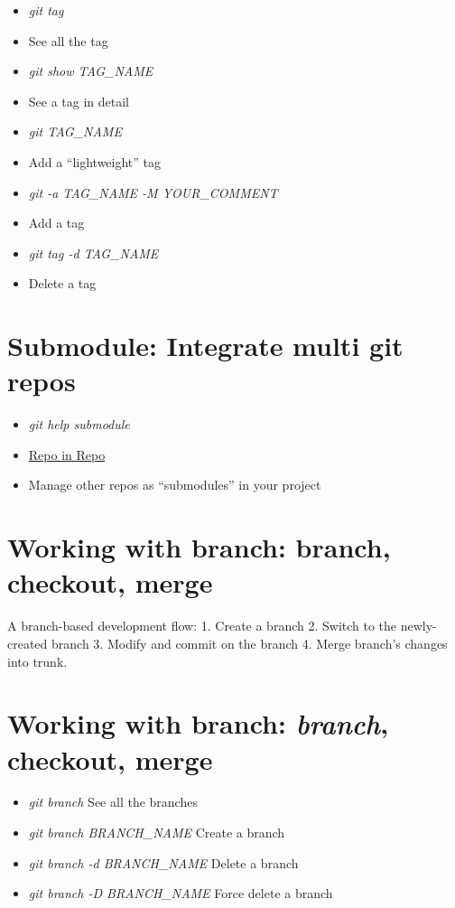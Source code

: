 \documentclass[]{article}
\begin{document}
\begin{itemize}
\item
  \emph{git tag}
\item
  See all the tag
\item
  \emph{git show TAG\_NAME}
\item
  See a tag in detail
\item
  \emph{git TAG\_NAME}
\item
  Add a ``lightweight'' tag
\item
  \emph{git -a TAG\_NAME -M YOUR\_COMMENT}
\item
  Add a tag
\item
  \emph{git tag -d TAG\_NAME}
\item
  Delete a tag
\end{itemize}
\section{Submodule: Integrate multi git repos}

\begin{itemize}
\item
  \emph{git help submodule}
\item
  \href{http://progit.org/book/ch6-6.html}{Repo in Repo}
\item
  Manage other repos as ``submodules'' in your project
\end{itemize}
\section{Working with \textbf{branch}: branch, checkout, merge}

A branch-based development flow: 1. Create a branch 2. Switch to the
newly-created branch 3. Modify and commit on the branch 4. Merge
branch's changes into trunk.

\section{Working with \textbf{branch}: \emph{branch}, checkout, merge}

\begin{itemize}
\item
  \emph{git branch} See all the branches
\item
  \emph{git branch BRANCH\_NAME} Create a branch
\item
  \emph{git branch -d BRANCH\_NAME} Delete a branch
\item
  \emph{git branch -D BRANCH\_NAME} Force delete a branch
\end{itemize}
\end{document}
